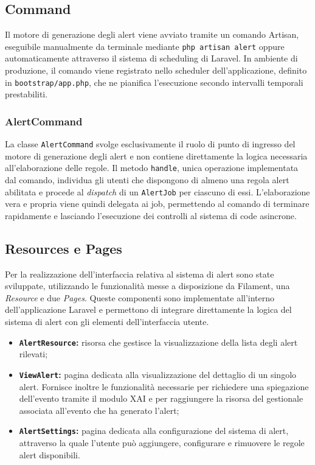 \subsection{Command}
Il motore di generazione degli alert viene avviato tramite un comando Artisan, eseguibile manualmente da terminale mediante \texttt{php artisan alert} oppure 
automaticamente attraverso il sistema di scheduling di Laravel. In ambiente di produzione, il comando viene registrato nello scheduler dell'applicazione, definito in 
\texttt{bootstrap/app.php}, che ne pianifica l'esecuzione secondo intervalli temporali prestabiliti.

\subsubsection*{AlertCommand}
La classe \texttt{AlertCommand} svolge esclusivamente il ruolo di punto di ingresso del motore di generazione degli alert e non contiene direttamente la logica 
necessaria all'elaborazione delle regole.
\newline
Il metodo \texttt{handle}, unica operazione implementata dal comando, individua gli utenti che dispongono di almeno una regola alert abilitata e procede al \textit{dispatch} di 
un \texttt{AlertJob} per ciascuno di essi. L'elaborazione vera e propria viene quindi delegata ai job, permettendo al comando di terminare rapidamente e lasciando l'esecuzione 
dei controlli al sistema di code asincrone.

\subsection{Resources e Pages}
Per la realizzazione dell'interfaccia relativa al sistema di alert sono state sviluppate, utilizzando le funzionalità messe a disposizione da Filament, una 
\textit{Resource} e due \textit{Pages}. Queste componenti sono implementate all'interno dell'applicazione Laravel e permettono di integrare direttamente la logica del 
sistema di alert con gli elementi dell'interfaccia utente.
\begin{itemize}
  \item \textbf{\texttt{AlertResource}:} risorsa che gestisce la visualizzazione della lista degli alert rilevati;
  \item \textbf{\texttt{ViewAlert}:} pagina dedicata alla visualizzazione del dettaglio di un singolo alert. Fornisce inoltre le funzionalità necessarie per richiedere una 
    spiegazione dell'evento tramite il modulo XAI e per raggiungere la risorsa del gestionale associata all'evento che ha generato l'alert;
  \item \textbf{\texttt{AlertSettings}:} pagina dedicata alla configurazione del sistema di alert, attraverso la quale l'utente può aggiungere, configurare e rimuovere le regole 
    alert disponibili.
\end{itemize}

